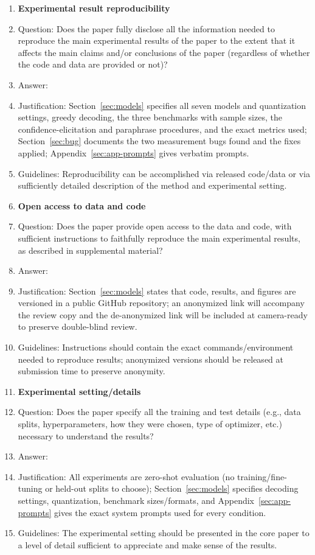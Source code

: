 \documentclass{article}
\begin{document}
\begin{enumerate}
\item {\bf Experimental result reproducibility}
    \item[] Question: Does the paper fully disclose all the information needed to reproduce the main experimental results of the paper to the extent that it affects the main claims and/or conclusions of the paper (regardless of whether the code and data are provided or not)?
    \item[] Answer: \answerYes{}
    \item[] Justification: Section~\ref{sec:models} specifies all seven models and quantization settings, greedy decoding, the three benchmarks with sample sizes, the confidence-elicitation and paraphrase procedures, and the exact metrics used; Section~\ref{sec:bug} documents the two measurement bugs found and the fixes applied; Appendix~\ref{sec:app-prompts} gives verbatim prompts.
    \item[] Guidelines: Reproducibility can be accomplished via released code/data or via sufficiently detailed description of the method and experimental setting.

\item {\bf Open access to data and code}
    \item[] Question: Does the paper provide open access to the data and code, with sufficient instructions to faithfully reproduce the main experimental results, as described in supplemental material?
    \item[] Answer: \answerYes{}
    \item[] Justification: Section~\ref{sec:models} states that code, results, and figures are versioned in a public GitHub repository; an anonymized link will accompany the review copy and the de-anonymized link will be included at camera-ready to preserve double-blind review.
    \item[] Guidelines: Instructions should contain the exact commands/environment needed to reproduce results; anonymized versions should be released at submission time to preserve anonymity.

\item {\bf Experimental setting/details}
    \item[] Question: Does the paper specify all the training and test details (e.g., data splits, hyperparameters, how they were chosen, type of optimizer, etc.) necessary to understand the results?
    \item[] Answer: \answerYes{}
    \item[] Justification: All experiments are zero-shot evaluation (no training/fine-tuning or held-out splits to choose); Section~\ref{sec:models} specifies decoding settings, quantization, benchmark sizes/formats, and Appendix~\ref{sec:app-prompts} gives the exact system prompts used for every condition.
    \item[] Guidelines: The experimental setting should be presented in the core paper to a level of detail sufficient to appreciate and make sense of the results.


\end{enumerate}
\end{document}
